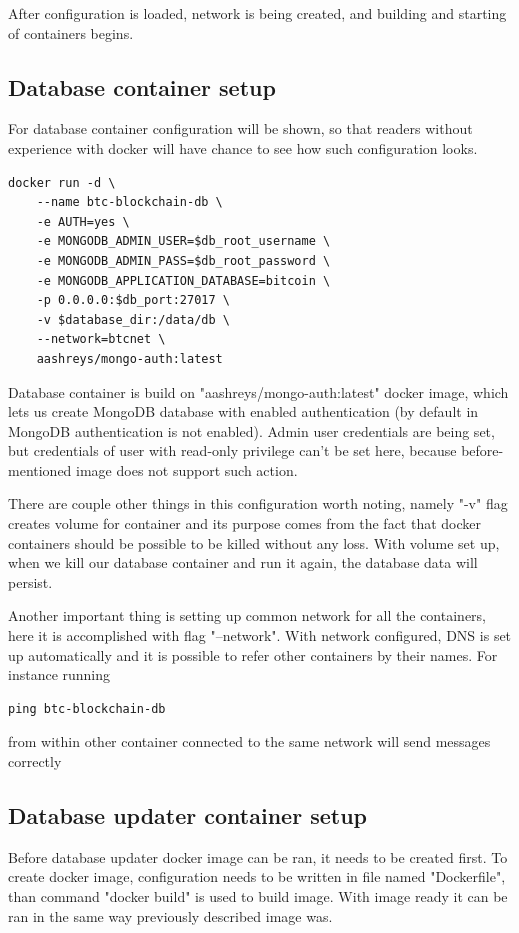 \documentclass[12pt, en, eng, oneside]{mgr}
\begin{document}
After configuration is loaded, network is being created, and building and starting of containers begins.

\subsection{Database container setup}
For database container configuration will be shown, so that readers without experience with docker will have chance to see how such configuration looks.

\begin{verbatim}
docker run -d \
    --name btc-blockchain-db \
    -e AUTH=yes \
    -e MONGODB_ADMIN_USER=$db_root_username \
    -e MONGODB_ADMIN_PASS=$db_root_password \
    -e MONGODB_APPLICATION_DATABASE=bitcoin \
    -p 0.0.0.0:$db_port:27017 \
    -v $database_dir:/data/db \
    --network=btcnet \
    aashreys/mongo-auth:latest
\end{verbatim}

Database container is build on "aashreys/mongo-auth:latest" docker image, which lets us create MongoDB database with enabled authentication (by default in MongoDB authentication is not enabled).
Admin user credentials are being set, but credentials of user with read-only privilege can't be set here, because before-mentioned image does not support such action.

There are couple other things in this configuration worth noting, namely "-v" flag creates volume for container and its purpose comes from the fact that docker containers should be possible to be killed without any loss. With volume set up, when we kill our database container and run it again, the database data will persist.

Another important thing is setting up common network for all the containers, here it is accomplished with flag "--network". With network configured, DNS is set up automatically and it is possible to refer other containers by their names. For instance running 
\begin{verbatim}
ping btc-blockchain-db
\end{verbatim}  
from within other container connected to the same network will send messages correctly

\subsection{Database updater container setup}
Before database updater docker image can be ran, it needs to be created first. To create docker image, configuration needs to be written in file named "Dockerfile", than command "docker build" is used to build image. With image ready it can be ran in the same way previously described image was.
\end{document}
